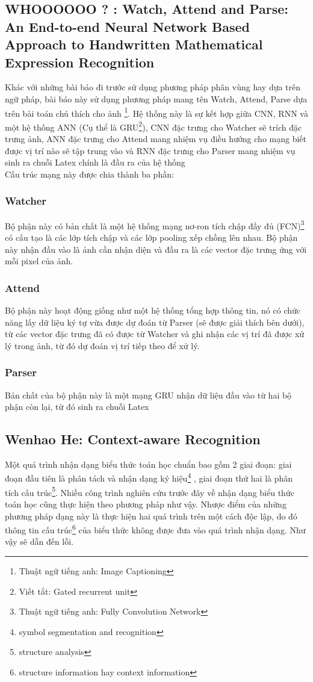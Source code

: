 \documentclass[a4paper,12pt]{article}
\begin{document}
	
	\subsection{WHOOOOOO ? \cite{zanibbi} : Watch, Attend and Parse: An End-to-end Neural Network Based Approach to Handwritten Mathematical Expression Recognition} 
	
	Khác với những bài báo đi trước sử dụng phương pháp phân vùng hay dựa trên ngữ pháp, bài báo này sử dụng phương pháp mang tên Watch, Attend, Parse dựa trên bài toán chú thích cho ảnh \footnote{Thuật ngữ tiếng anh: Image Captioning}. Hệ thống này là sự kết hợp giữa CNN, RNN và một hệ thống ANN (Cụ thể là GRU\footnote{Viết tắt: Gated recurrent unit}), CNN đặc trưng cho Watcher sẽ trích đặc trưng ảnh, ANN đặc trưng cho Attend mang nhiệm vụ điều hướng cho mạng biết được vị trí nào sẽ tập trung vào và RNN đặc trưng cho Parser mang nhiệm vụ sinh ra chuỗi Latex chính là đầu ra của hệ thống\\
	
	Cấu trúc mạng này được chia thành ba phần:
	\subsubsection{Watcher}
	Bộ phận này có bản chất là một hệ thống mạng nơ-ron tích chập đầy đủ (FCN)\footnote{Thuật ngữ tiếng anh: Fully Convolution Network} có cấu tạo là các lớp tích chập và các lớp pooling xếp chồng lên nhau. Bộ phận này nhận đầu vào là ảnh cần nhận diện và đầu ra là các vector đặc trưng ứng với mỗi pixel của ảnh.
	
	\subsubsection{Attend}
	Bộ phận này hoạt động giống như một hệ thống tổng hợp thông tin, nó có chức năng lấy dữ liệu ký tự vừa được dự đoán từ Parser (sẽ được giải thích bên dưới), từ các vector đặc trưng đã có được từ Watcher và ghi nhận các vị trí đã được xử lý trong ảnh, từ đó dự đoán vị trí tiếp theo để xử lý.
	
	\subsubsection{Parser}
	Bản chất của bộ phận này là một mạng GRU nhận dữ liệu đầu vào từ hai bộ phận còn lại, từ đó sinh ra chuỗi Latex
	
	\subsection{Wenhao He\cite{context}: Context-aware Recognition}
	\label{subsec: context}
	Một quá trình nhận dạng biểu thức toán học chuẩn bao gồm 2 giai đoạn: giai đoạn đầu tiên là phân tách và nhận dạng ký hiệu\footnote{symbol segmentation and recognition} , giai đoạn thứ hai là phân tích cấu trúc\footnote{structure analysis}. Nhiều công trình nghiên cứu trước đây về nhận dạng biểu thức toán học cũng thực hiện theo phương pháp như vậy. Nhược điểm của những phương pháp dạng này là thực hiện hai quá trình trên một cách độc lập, do đó thông tin cấu trúc\footnote{structure information hay context information} của biểu thức không được đưa vào quá trình nhận dạng. Như vậy sẽ dẫn đến lỗi\cite{context}.
	
\end{document}
